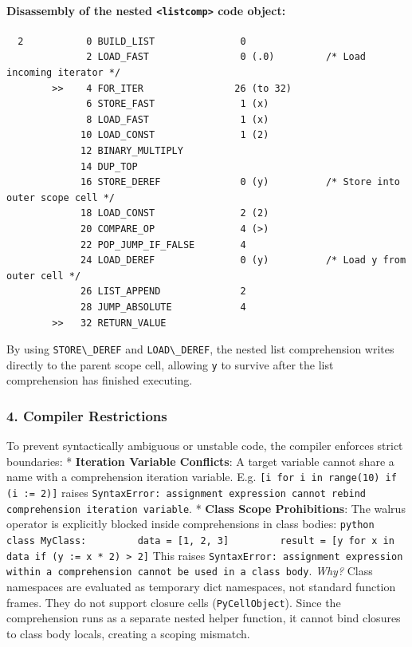 \hypertarget{disassembly-of-the-nested-listcomp-code-object}{%
\paragraph{\texorpdfstring{Disassembly of the nested
\texttt{\textless{}listcomp\textgreater{}} code
object:}{Disassembly of the nested \textless listcomp\textgreater{} code object:}}\label{disassembly-of-the-nested-listcomp-code-object}}

\begin{lstlisting}
  2           0 BUILD_LIST               0
              2 LOAD_FAST                0 (.0)         /* Load incoming iterator */
        >>    4 FOR_ITER                26 (to 32)
              6 STORE_FAST               1 (x)
              8 LOAD_FAST                1 (x)
             10 LOAD_CONST               1 (2)
             12 BINARY_MULTIPLY
             14 DUP_TOP
             16 STORE_DEREF              0 (y)          /* Store into outer scope cell */
             18 LOAD_CONST               2 (2)
             20 COMPARE_OP               4 (>)
             22 POP_JUMP_IF_FALSE        4
             24 LOAD_DEREF               0 (y)          /* Load y from outer cell */
             26 LIST_APPEND              2
             28 JUMP_ABSOLUTE            4
        >>   32 RETURN_VALUE
\end{lstlisting}

By using \passthrough{\lstinline!STORE\_DEREF!} and
\passthrough{\lstinline!LOAD\_DEREF!}, the nested list comprehension
writes directly to the parent scope cell, allowing
\passthrough{\lstinline!y!} to survive after the list comprehension has
finished executing.

\hypertarget{compiler-restrictions}{%
\subsubsection{4. Compiler Restrictions}\label{compiler-restrictions}}

To prevent syntactically ambiguous or unstable code, the compiler
enforces strict boundaries: * \textbf{Iteration Variable Conflicts}: A
target variable cannot share a name with a comprehension iteration
variable. E.g.
\passthrough{\lstinline![i for i in range(10) if (i := 2)]!} raises
\passthrough{\lstinline!SyntaxError: assignment expression cannot rebind comprehension iteration variable!}.
* \textbf{Class Scope Prohibitions}: The walrus operator is explicitly
blocked inside comprehensions in class bodies:
\passthrough{\lstinline!python     class MyClass:         data = [1, 2, 3]         result = [y for x in data if (y := x * 2) > 2]!}
This raises
\passthrough{\lstinline!SyntaxError: assignment expression within a comprehension cannot be used in a class body!}.
\emph{Why?} Class namespaces are evaluated as temporary dict namespaces,
not standard function frames. They do not support closure cells
(\passthrough{\lstinline!PyCellObject!}). Since the comprehension runs
as a separate nested helper function, it cannot bind closures to class
body locals, creating a scoping mismatch.

